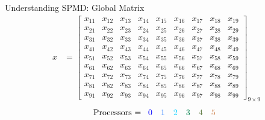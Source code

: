 \begin{frame}
\begin{exampleblock}{Understanding SPMD:  Global Matrix}
\begin{align*}
x &= \left[
      \begin{array}{lllllllll}
      x_{11} & x_{12} & x_{13} & x_{14} & x_{15} & x_{16} & x_{17} & x	_{18} & x_{19}\\
      x_{21} & x_{22} & x_{23} & x_{24} & x_{25} & x_{26} & x_{27} & x	_{28} & x_{29}\\
      x_{31} & x_{32} & x_{33} & x_{34} & x_{35} & x_{36} & x_{37} & x	_{38} & x_{39}\\
      x_{41} & x_{42} & x_{43} & x_{44} & x_{45} & x_{46} & x_{47} & x	_{48} & x_{49}\\
      x_{51} & x_{52} & x_{53} & x_{54} & x_{55} & x_{56} & x_{57} & x	_{58} & x_{59}\\
      x_{61} & x_{62} & x_{63} & x_{64} & x_{65} & x_{66} & x_{67} & x	_{68} & x_{69}\\
      x_{71} & x_{72} & x_{73} & x_{74} & x_{75} & x_{76} & x_{77} & x	_{78} & x_{79}\\
      x_{81} & x_{82} & x_{83} & x_{84} & x_{85} & x_{86} & x_{87} & x	_{88} & x_{89}\\
      x_{91} & x_{92} & x_{93} & x_{94} & x_{95} & x_{96} & x_{97} & x	_{98} & x_{99}
      \end{array}
\right]_{9\times 9}
\end{align*}
\begin{align*}
\text{Processors = }
      \begin{array}{llllll}
      \color{g11}0 & \color{g12}1 & \color{g13}2 & \color{g21}3 & \color{g22}4 & \color{g23}5
      \end{array}
\end{align*}
\end{exampleblock}
\end{frame}


